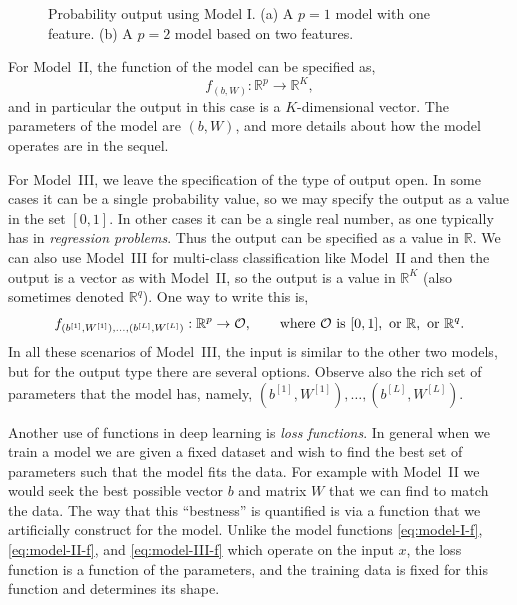 \documentclass[12pt]{article}
\begin{document}
\begin{figure}[h!]
\begin{subfigure}[b]{0.45\linewidth}
    \caption{} 
  \end{subfigure} 
    \caption{Probability output using Model I. %
    (a) A $p=1$ model with one feature. %
    (b) A $p=2$ model based on two features. %
    }
    \label{fig:breast-log-curves}
\end{figure}


For Model~II, the function of the model can be specified as,
%
\begin{equation}
\label{eq:model-II-f}
f_{(b,W)}: {\mathbb R}^p \to {\mathbb R}^K,
\end{equation}
%
and in particular the output in this case is a $K$-dimensional vector. The parameters of the model are $(b,W)$, and more details about how the model operates are in the sequel.

For Model~III, we leave the specification of the type of output open. In some cases it can be a single probability value, so we may specify the output as a value in the set $[0,1]$. In other cases it can be a single real number, as one typically has in {\em regression problems}. Thus the output can be specified as a value in ${\mathbb R}$. We can also use Model~III for multi-class classification like Model~II and then the output is a vector as with Model~II, so the output is a value in ${\mathbb R}^K$ (also sometimes denoted ${\mathbb R}^q$). One way to write this is,
%
\begin{equation}
\label{eq:model-III-f}
f_{(b^{[1]}, W^{[1]}), \ldots, (b^{[L]}, W^{[L]})}: {\mathbb R}^p \to {\cal O},
\qquad
\text{where}
~{\cal O}~
\text{is}~[0,1],~\text{or}~
{\mathbb R},~\text{or}~{\mathbb R}^q.
\end{equation}
%
In all these scenarios of Model~III, the input is similar to the other two models, but for the output type there are several options. Observe also the rich set of parameters that the model has, namely, $(b^{[1]}, W^{[1]}), \ldots, (b^{[L]}, W^{[L]})$.

Another use of functions in deep learning is {\em loss functions}. In general when we train a model we are given a fixed dataset and wish to find the best set of parameters such that the model fits the data. For example with Model~II we would seek the best possible vector $b$ and matrix $W$ that we can find to match the data.  The way that this ``bestness'' is quantified is via a function that we artificially construct for the model. Unlike the model functions \eqref{eq:model-I-f}, \eqref{eq:model-II-f}, and \eqref{eq:model-III-f} which operate on the input $x$, the loss function is a function of the parameters, and the training data is fixed for this function and determines its shape.
\end{document}
